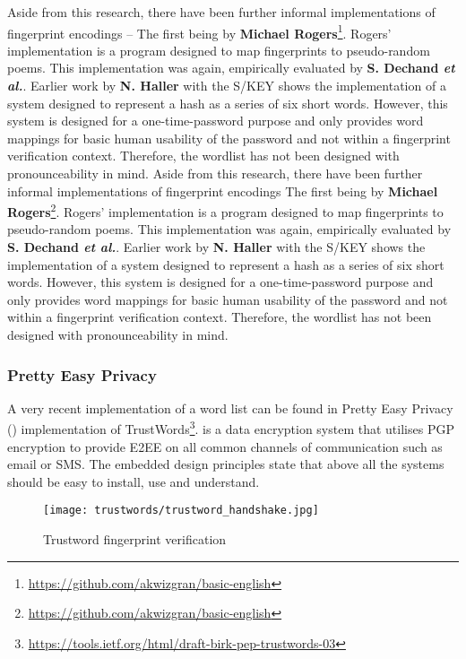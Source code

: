 Aside from this research, there have been further informal implementations of fingerprint encodings -- The first being by \textbf{Michael Rogers}\footnote{\url{https://github.com/akwizgran/basic-english}}. Rogers' implementation is a program designed to map fingerprints to pseudo-random poems. This implementation was again, empirically evaluated by \textbf{S. Dechand \textit{et al.}}\cite{dechand2016empirical}. Earlier work by \textbf{N. Haller} with the S/KEY\cite{haller1995s} shows the implementation of a system designed to represent a hash as a series of six short words. However, this system is designed for a one-time-password purpose and only provides word mappings for basic human usability of the password and not within a fingerprint verification context. Therefore, the wordlist has not been designed with pronounceability in mind.
Aside from this research, there have been further informal implementations of fingerprint encodings  The first being by \textbf{Michael Rogers}\footnote{\url{https://github.com/akwizgran/basic-english}}. Rogers' implementation is a program designed to map fingerprints to pseudo-random poems. This implementation was again, empirically evaluated by \textbf{S. Dechand \textit{et al.}}\cite{dechand2016empirical}. Earlier work by \textbf{N. Haller} with the S/KEY\cite{haller1995s} shows the implementation of a system designed to represent a hash as a series of six short words. However, this system is designed for a one-time-password purpose and only provides word mappings for basic human usability of the password and not within a fingerprint verification context. Therefore, the wordlist has not been designed with pronounceability in mind.

\newpage
\subsubsection*{Pretty Easy Privacy}
\label{sec:pep}
A very recent implementation of a word list can be found in Pretty Easy Privacy (\pep) implementation of TrustWords\footnote{\url{https://tools.ietf.org/html/draft-birk-pep-trustwords-03}}. \pep is a data encryption system that utilises PGP encryption to provide E2EE on all common channels of communication such as email or SMS. The embedded design principles state that above all the systems should be easy to install, use and understand.

\begin{wrapfigure}{r}{6cm}
    \centering
    \texttt{[image: trustwords/trustword\_handshake.jpg]}
    \caption{Trustword fingerprint verification}
    \label{fig:trustwords}
\end{wrapfigure}

